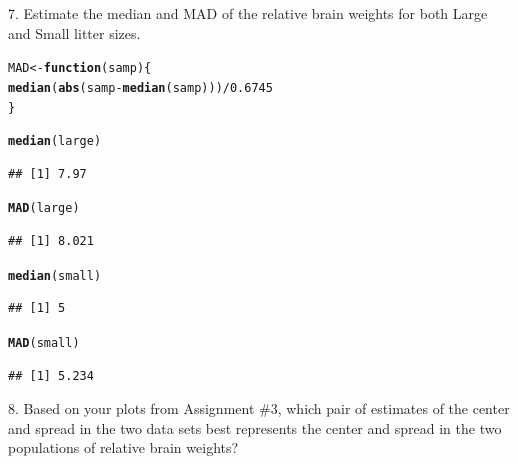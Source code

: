 \documentclass{article}\usepackage{graphicx, color}
\makeatletter
\newcommand{\hlfunctioncall}[1]{\textcolor[rgb]{0.501960784313725,0,0.329411764705882}{\textbf{#1}}}%
\newenvironment{kframe}{%
 \def\at@end@of@kframe{}%
 \ifinner\ifhmode%
  \def\at@end@of@kframe{\end{minipage}}%
  \begin{minipage}{\columnwidth}%
 \fi\fi%
 \def\FrameCommand##1{\hskip\@totalleftmargin \hskip-\fboxsep
 \colorbox{shadecolor}{##1}\hskip-\fboxsep
     \hskip-\linewidth \hskip-\@totalleftmargin \hskip\columnwidth}%
 \MakeFramed {\advance\hsize-\width
   \@totalleftmargin\z@ \linewidth\hsize
   \@setminipage}}%
 {\par\unskip\endMakeFramed%
 \at@end@of@kframe}
\newenvironment{knitrout}{}{} %
\makeatother
\begin{document}
\item[7.] Estimate the median and MAD of the relative brain weights for both Large and Small litter sizes.
\begin{shaded}
\begin{knitrout}
\color{fgcolor}\begin{kframe}
\begin{alltt}
MAD <- \hlfunctioncall{function}(samp) \{
    \hlfunctioncall{median}(\hlfunctioncall{abs}(samp - \hlfunctioncall{median}(samp)))/0.6745
\}

\hlfunctioncall{median}(large)
\end{alltt}
\begin{verbatim}
## [1] 7.97
\end{verbatim}
\begin{alltt}
\hlfunctioncall{MAD}(large)
\end{alltt}
\begin{verbatim}
## [1] 8.021
\end{verbatim}
\begin{alltt}
\hlfunctioncall{median}(small)
\end{alltt}
\begin{verbatim}
## [1] 5
\end{verbatim}
\begin{alltt}
\hlfunctioncall{MAD}(small)
\end{alltt}
\begin{verbatim}
## [1] 5.234
\end{verbatim}
\end{kframe}
\end{knitrout}


\end{shaded}
\item[8.] Based on your plots from Assignment \#3, which pair of estimates of the center and spread in the two data sets best represents the center and spread in the two populations of relative brain weights?
\end{document}
